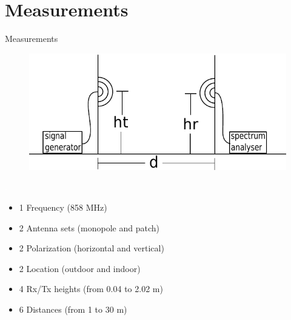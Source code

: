 \documentclass[10pt]{beamer}
\begin{document}
\section{Measurements}
\begin{frame}{Measurements}
\begin{figure}[!htbp]
	\centering
	\includegraphics[width = \columnwidth]{figures/setup.pdf}
\end{figure}
\begin{minipage}{0.15\textwidth}
 \textcolor{white}{.}  
\end{minipage}%
\begin{minipage}{0.8\textwidth}
\begin{itemize}
\item 1 Frequency (858 MHz)
\item 2 Antenna sets (monopole and patch)
\item 2 Polarization (horizontal and vertical)
\item 2 Location (outdoor and indoor)
\item 4 Rx/Tx heights (from 0.04 to 2.02 m)
\item 6 Distances (from 1 to 30 m)
\end{itemize}
\end{minipage}
\end{frame}

\end{document}
